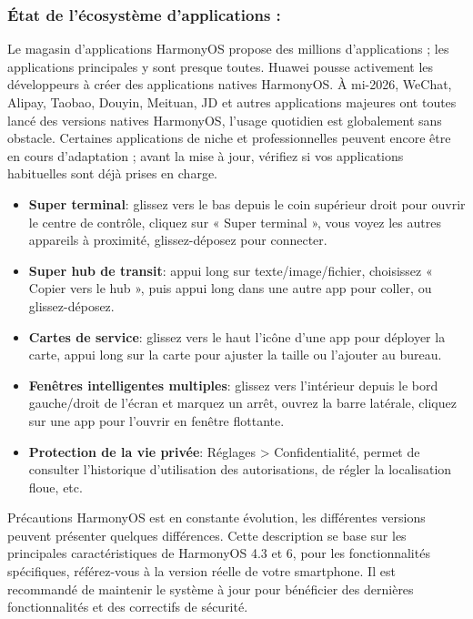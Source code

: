 \subsubsection*{État de l'écosystème d'applications :}

Le magasin d'applications HarmonyOS propose des millions d'applications ; les applications principales y sont presque toutes. Huawei pousse activement les développeurs à créer des applications natives HarmonyOS. À mi-2026, WeChat, Alipay, Taobao, Douyin, Meituan, JD et autres applications majeures ont toutes lancé des versions natives HarmonyOS, l'usage quotidien est globalement sans obstacle. Certaines applications de niche et professionnelles peuvent encore être en cours d'adaptation ; avant la mise à jour, vérifiez si vos applications habituelles sont déjà prises en charge.


\begin{itemize}
  \item \textbf{Super terminal}: glissez vers le bas depuis le coin supérieur droit pour ouvrir le centre de contrôle, cliquez sur « Super terminal », vous voyez les autres appareils à proximité, glissez-déposez pour connecter.
  \item \textbf{Super hub de transit}: appui long sur texte/image/fichier, choisissez « Copier vers le hub », puis appui long dans une autre app pour coller, ou glissez-déposez.
  \item \textbf{Cartes de service}: glissez vers le haut l'icône d'une app pour déployer la carte, appui long sur la carte pour ajuster la taille ou l'ajouter au bureau.
  \item \textbf{Fenêtres intelligentes multiples}: glissez vers l'intérieur depuis le bord gauche/droit de l'écran et marquez un arrêt, ouvrez la barre latérale, cliquez sur une app pour l'ouvrir en fenêtre flottante.
  \item \textbf{Protection de la vie privée}: Réglages > Confidentialité, permet de consulter l'historique d'utilisation des autorisations, de régler la localisation floue, etc.
\end{itemize}

\begin{tcbwarn}{Précautions}
HarmonyOS est en constante évolution, les différentes versions peuvent présenter quelques différences. Cette description se base sur les principales caractéristiques de HarmonyOS 4.3 et 6, pour les fonctionnalités spécifiques, référez-vous à la version réelle de votre smartphone. Il est recommandé de maintenir le système à jour pour bénéficier des dernières fonctionnalités et des correctifs de sécurité.

\end{tcbwarn}

